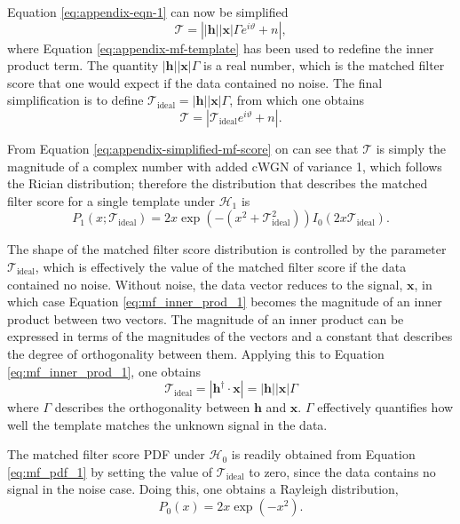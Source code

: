 Equation \ref{eq:appendix-eqn-1} can now be simplified
\begin{equation}
    \mathcal{T}= \left||\mathbf{h}||\mathbf{x}|\Gamma e^{i\vartheta}+n\right|,
\end{equation}
where Equation \ref{eq:appendix-mf-template} has been used to redefine the inner product term. The quantity $|\mathbf{h}||\mathbf{x}|\Gamma$ is a real number, which is the matched filter score that one would expect if the data contained no noise. The final simplification is to define $\mathcal{T}_\mathrm{ideal}=|\mathbf{h}||\mathbf{x}|\Gamma$, from which one obtains
\begin{equation}
    \mathcal{T}=|\mathcal{T}_\mathrm{ideal}e^{i\vartheta}+n|.
    \label{eq:appendix-simplified-mf-score}
\end{equation}

From Equation \ref{eq:appendix-simplified-mf-score} on can see that $\mathcal{T}$ is simply the magnitude of a complex number with added cWGN of variance 1, which follows the Rician distribution; therefore the distribution that describes the matched filter score for a single template under $\mathcal{H}_1$ is
\begin{equation}
    P_1(x;\mathcal{T}_\mathrm{ideal}) = 2x\exp{\left(-\left(x^2+\mathcal{T}_\mathrm{ideal}^2 \right)\right)}I_0(2x\mathcal{T}_\mathrm{ideal}).
    \label{eq:mf_pdf_1}
\end{equation}

The shape of the matched filter score distribution is controlled by the parameter $\mathcal{T}_\mathrm{ideal}$, which is effectively the value of the matched filter score if the data contained no noise. Without noise, the data vector reduces to the signal, $\mathbf{x}$, in which case Equation \ref{eq:mf_inner_prod_1} becomes the magnitude of an inner product between two vectors. The magnitude of an inner product can be expressed in terms of the magnitudes of the vectors and a constant that describes the degree of orthogonality between them. Applying this to Equation \ref{eq:mf_inner_prod_1}, one obtains
\begin{equation}
    \mathcal{T}_\mathrm{ideal}=\left|\mathbf{h}^\dagger\cdot\mathbf{x}\right| = \left|\mathbf{h}\right|\left|\mathbf{x}\right|\Gamma
\end{equation}
where $\Gamma$ describes the orthogonality between $\mathbf{h}$ and $\mathbf{x}$. $\Gamma$ effectively quantifies how well the template matches the unknown signal in the data.

The matched filter score PDF under $\mathcal{H}_0$ is readily obtained from Equation \ref{eq:mf_pdf_1} by setting the value of $\mathcal{T}_\mathrm{ideal}$ to zero, since the data contains no signal in the noise case. Doing this, one obtains a Rayleigh distribution,
\begin{equation}
    P_0(x) = 2x\exp{\left(-x^2\right)}.
    \label{eq:mf_pdf_0}
\end{equation}

